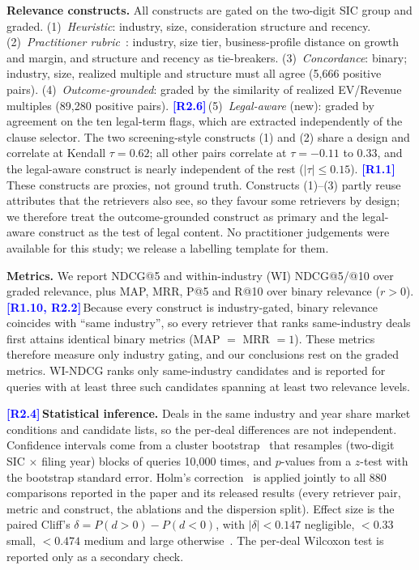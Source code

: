 \documentclass[conference]{IEEEtran}
\newcommand{\rc}[1]{\textcolor{blue}{\textbf{[#1]}}\,}
\newcommand{\rc}[1]{}
\begin{document}
\noindent\textbf{Relevance constructs.}
All constructs are gated on the two-digit SIC group and graded. (1)~\emph{Heuristic}: industry, size, consideration structure and recency. (2)~\emph{Practitioner rubric}~\cite{damodaran2012}: industry, size tier, business-profile distance on growth and margin, and structure and recency as tie-breakers. (3)~\emph{Concordance}: binary; industry, size, realized multiple and structure must all agree (5{,}666 positive pairs). (4)~\emph{Outcome-grounded}: graded by the similarity of realized EV/Revenue multiples (89{,}280 positive pairs). \rc{R2.6}(5)~\emph{Legal-aware} (new): graded by agreement on the ten legal-term flags, which are extracted independently of the clause selector. The two screening-style constructs (1) and (2) share a design and correlate at Kendall $\tau=0.62$; all other pairs correlate at $\tau=-0.11$ to $0.33$, and the legal-aware construct is nearly independent of the rest ($|\tau|\le0.15$). \rc{R1.1}These constructs are proxies, not ground truth. Constructs (1)--(3) partly reuse attributes that the retrievers also see, so they favour some retrievers by design; we therefore treat the outcome-grounded construct as primary and the legal-aware construct as the test of legal content. No practitioner judgements were available for this study; we release a labelling template for them.

\noindent\textbf{Metrics.}
We report NDCG@5 and within-industry (WI) NDCG@5/@10 over graded relevance, plus MAP, MRR, P@5 and R@10 over binary relevance ($r>0$). \rc{R1.10, R2.2}Because every construct is industry-gated, binary relevance coincides with ``same industry'', so every retriever that ranks same-industry deals first attains identical binary metrics (MAP $=$ MRR $=1$). These metrics therefore measure only industry gating, and our conclusions rest on the graded metrics. WI-NDCG ranks only same-industry candidates and is reported for queries with at least three such candidates spanning at least two relevance levels.

\rc{R2.4}\noindent\textbf{Statistical inference.}
Deals in the same industry and year share market conditions and candidate lists, so the per-deal differences are not independent. Confidence intervals come from a cluster bootstrap~\cite{cameron2008} that resamples (two-digit SIC $\times$ filing year) blocks of queries 10{,}000 times, and $p$-values from a $z$-test with the bootstrap standard error. Holm's correction~\cite{holm1979} is applied jointly to all 880 comparisons reported in the paper and its released results (every retriever pair, metric and construct, the ablations and the dispersion split). Effect size is the paired Cliff's $\delta=P(d>0)-P(d<0)$, with $|\delta|<0.147$ negligible, $<0.33$ small, $<0.474$ medium and large otherwise~\cite{cliff1993}. The per-deal Wilcoxon test is reported only as a secondary check.
\end{document}
